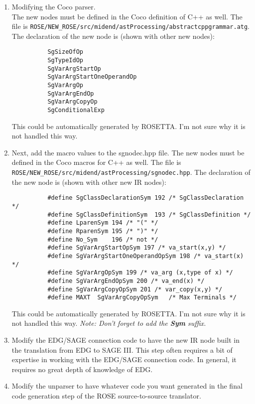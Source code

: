 \begin{enumerate}
     \item Modifying the Coco parser. \\
           The new nodes must be defined in the Coco definition of C++ as well.
           The file is {\tt ROSE/NEW\_ROSE/src/midend/astProcessing/abstractcppgrammar.atg}.
           The declaration of the new node is (shown with other new nodes):
{\indent
{\mySmallFontSize
\begin{verbatim}
          SgSizeOfOp
          SgTypeIdOp
          SgVarArgStartOp
          SgVarArgStartOneOperandOp
          SgVarArgOp
          SgVarArgEndOp
          SgVarArgCopyOp
          SgConditionalExp
\end{verbatim} 
}}
          This could be automatically generated by ROSETTA. I'm not sure why it is
          not handled this way.

     \item Next, add the macro values to the sgnodec.hpp file.
           The new nodes must be defined in the Coco macros for C++ as well.
           The file is {\tt ROSE/NEW\_ROSE/src/midend/astProcessing/sgnodec.hpp}.
           The declaration of the new node is (shown with other new IR nodes):
{\indent
{\mySmallFontSize
\begin{verbatim}
          #define SgClassDeclarationSym	192	/* SgClassDeclaration */
          #define SgClassDefinitionSym	193	/* SgClassDefinition */
          #define LparenSym	194	/* "(" */
          #define RparenSym	195	/* ")" */
          #define No_Sym	196	/* not */
          #define SgVarArgStartOpSym 197 /* va_start(x,y) */
          #define SgVarArgStartOneOperandOpSym 198 /* va_start(x) */
          #define SgVarArgOpSym 199 /* va_arg (x,type of x) */
          #define SgVarArgEndOpSym 200 /* va_end(x) */
          #define SgVarArgCopyOpSym 201 /* var_copy(x,y) */
          #define MAXT	SgVarArgCopyOpSym	/* Max Terminals */
\end{verbatim} 
}}
          This could be automatically generated by ROSETTA. I'm not sure why it is
          not handled this way. {\em Note: Don't forget to add the {\bf Sym} suffix.}

     \item Modify the EDG/SAGE connection code to have the new IR node built in the
           translation from EDG to SAGE III.  This step often requires a bit of expertise
           in working with the EDG/SAGE connection code. In general, it requires no great
           depth of knowledge of EDG.

     \item Modify the unparser to have whatever code you want generated in the final
           code generation step of the ROSE source-to-source translator.

\end{enumerate}



